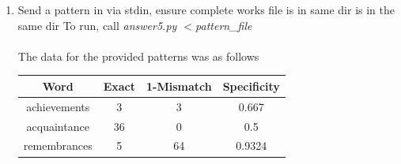 \documentclass[12pt]{article}
\begin{document}
\begin{enumerate}
\begin{flushleft}
\begin{tabular}{ |c|c|c|c| }
        \hline
        \end{tabular}
        \end{flushleft}
    \item Send a pattern in via stdin, ensure complete works file is in same dir is in the same dir To run, call
        \textit{answer5.py $<$pattern\_file} \\ \\
        The data for the provided patterns was as follows \\
        \begin{flushleft}
            \begin{tabular}{ |c|c|c|c| }
            \hline
            \textbf{Word} & \textbf{Exact} & \textbf{1-Mismatch} & \textbf{Specificity} \\
            \hline
            achievements & 3 & 3 & 0.667 \\
            acquaintance & 36 & 0 & 0.5 \\
            remembrances & 5 & 64 & 0.9324 \\
            \hline
            \end{tabular}
            \end{flushleft}
\end{enumerate}



\end{document}
